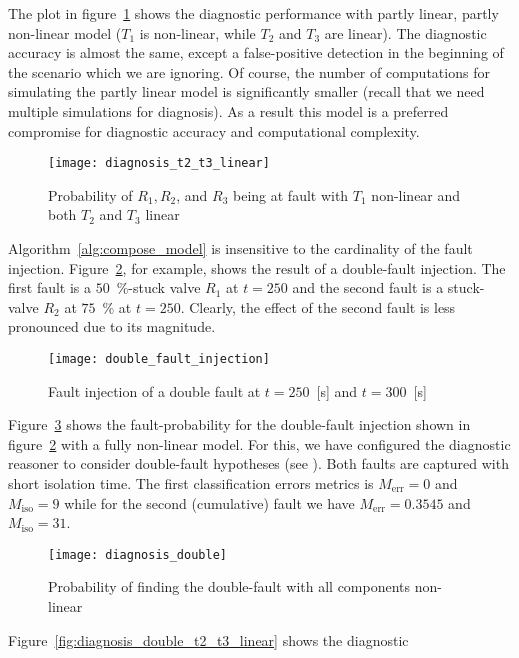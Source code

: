 %
The plot in figure~\ref{fig:diagnosis_t2_t3_linear} shows the
diagnostic performance with partly linear, partly non-linear model
($T_1$ is non-linear, while $T_2$ and $T_3$ are linear). The
diagnostic accuracy is almost the same, except a false-positive
detection in the beginning of the scenario which we are ignoring. Of
course, the number of computations for simulating the partly linear
model is significantly smaller (recall that we need multiple
simulations for diagnosis). As a result this model is a preferred
compromise for diagnostic accuracy and computational complexity.
%
\begin{figure}[htb]
  \centering
  \texttt{[image: diagnosis\_t2\_t3\_linear]}
  \caption{Probability of $R_1, R_2$, and $R_3$ being at fault with $T_1$ non-linear and both $T_2$ and $T_3$ linear}
  \label{fig:diagnosis_t2_t3_linear}
\end{figure}
\par
%
Algorithm~\ref{alg:compose_model} is insensitive to the cardinality of
the fault injection. Figure~\ref{fig:double_fault_injection}, for
example, shows the result of a double-fault injection. The first fault
is a $50$~\%-stuck valve $R_1$ at $t = 250$ and the second fault is a
stuck-valve $R_2$ at $75$~\% at $t = 250$. Clearly, the effect of the
second fault is less pronounced due to its magnitude.
%
\begin{figure}[htb]
  \centering
  \texttt{[image: double\_fault\_injection]}
  \caption{Fault injection of a double fault at $t = 250$~[s] and $t = 300$~[s]}
  \label{fig:double_fault_injection}
\end{figure}
\par
Figure~\ref{fig:diagnosis_double} shows the fault-probability for the
double-fault injection shown in
figure~\ref{fig:double_fault_injection} with a fully non-linear
model. For this, we have configured the diagnostic reasoner to
consider double-fault hypotheses (see \cite{feldman13genius}). Both
faults are captured with short isolation time. The first
classification errors metrics is $M_{\mathrm{err}} = 0$ and
$M_{\mathrm{iso}} = 9$ while for the second (cumulative) fault we have
$M_{\mathrm{err}} = 0.3545$ and $M_{\mathrm{iso}} = 31$.
%
\begin{figure}[htb]
  \centering
  \texttt{[image: diagnosis\_double]}
  \caption{Probability of finding the double-fault with all components non-linear}
  \label{fig:diagnosis_double}
\end{figure}
\par
Figure~\ref{fig:diagnosis_double_t2_t3_linear} shows the diagnostic
